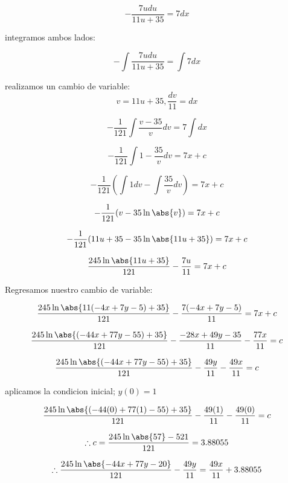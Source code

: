 $$-\frac{7u du}{11u+35}=7 dx$$

integramos ambos lados:

$$- \int \frac{7u du}{11u+35}=\int 7 dx$$

realizamos un cambio de variable:
$$v=11u+35, \frac{dv}{11}=dx$$

$$-\frac{1}{121}\int \frac{v-35}{v} dv =7\int dx$$

$$-\frac{1}{121}\int 1- \frac{35}{v} dv =7x+c$$

$$-\frac{1}{121}(\int 1 dv- \int\frac{35}{v} dv) =7x+c$$

$$-\frac{1}{121}(v-35 \ln \abs{v}) =7x+c$$

$$-\frac{1}{121}(11u+35-35 \ln \abs{11u+35}) =7x+c$$

$$\frac{245 \ln \abs{11u+35}}{121}-\frac{7u}{11} =7x+c$$

Regresamos nuestro cambio de variable:

$$\frac{245 \ln \abs{11(-4x+7y-5)+35}}{121}-\frac{7(-4x+7y-5)}{11} =7x+c$$

$$\frac{245 \ln \abs{(-44x+77y-55)+35}}{121}-\frac{-28x+49y-35}{11} - \frac{77 x}{11}=c$$

$$\frac{245 \ln \abs{(-44x+77y-55)+35}}{121}-\frac{49y}{11} - \frac{49 x}{11}=c$$

aplicamos la condicion inicial; $y(0)=1$

$$\frac{245 \ln \abs{(-44(0)+77(1)-55)+35}}{121}-\frac{49(1)}{11} - \frac{49(0)}{11}=c$$

$$\therefore c=\frac{245 \ln \abs{57}-521}{121}=3.88055$$

$$\therefore \frac{245 \ln \abs{-44x+77y-20}}{121}-\frac{49y}{11}= \frac{49 x}{11} +3.88055$$
